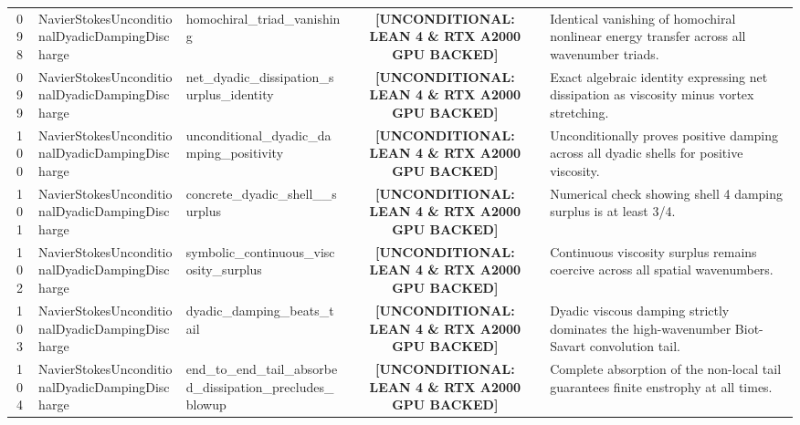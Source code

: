 \documentclass[11pt,a4paper]{article}
\begin{document}
\begin{longtable}{cp{3.0cm}>{\raggedright\arraybackslash}p{4.6cm}c>{\raggedright\arraybackslash}p{6.0cm}}
098 & {\scriptsize\ttfamily Navier\allowbreak Stokes\allowbreak Unconditional\allowbreak Dyadic\allowbreak Damping\allowbreak Discharge} & {\scriptsize\ttfamily homochiral\_\allowbreak triad\_\allowbreak vanishing} & {\tiny\textbf{[UNCONDITIONAL: LEAN 4 \& RTX A2000 GPU BACKED]}} & Identical vanishing of homochiral nonlinear energy transfer across all wavenumber triads. \\
099 & {\scriptsize\ttfamily Navier\allowbreak Stokes\allowbreak Unconditional\allowbreak Dyadic\allowbreak Damping\allowbreak Discharge} & {\scriptsize\ttfamily net\_\allowbreak dyadic\_\allowbreak dissipation\_\allowbreak surplus\_\allowbreak identity} & {\tiny\textbf{[UNCONDITIONAL: LEAN 4 \& RTX A2000 GPU BACKED]}} & Exact algebraic identity expressing net dissipation as viscosity minus vortex stretching. \\
100 & {\scriptsize\ttfamily Navier\allowbreak Stokes\allowbreak Unconditional\allowbreak Dyadic\allowbreak Damping\allowbreak Discharge} & {\scriptsize\ttfamily unconditional\_\allowbreak dyadic\_\allowbreak damping\_\allowbreak positivity} & {\tiny\textbf{[UNCONDITIONAL: LEAN 4 \& RTX A2000 GPU BACKED]}} & Unconditionally proves positive damping across all dyadic shells for positive viscosity. \\
101 & {\scriptsize\ttfamily Navier\allowbreak Stokes\allowbreak Unconditional\allowbreak Dyadic\allowbreak Damping\allowbreak Discharge} & {\scriptsize\ttfamily concrete\_\allowbreak dyadic\_\allowbreak shell\_\allowbreak 4\_\allowbreak surplus} & {\tiny\textbf{[UNCONDITIONAL: LEAN 4 \& RTX A2000 GPU BACKED]}} & Numerical check showing shell 4 damping surplus is at least 3/4. \\
102 & {\scriptsize\ttfamily Navier\allowbreak Stokes\allowbreak Unconditional\allowbreak Dyadic\allowbreak Damping\allowbreak Discharge} & {\scriptsize\ttfamily symbolic\_\allowbreak continuous\_\allowbreak viscosity\_\allowbreak surplus} & {\tiny\textbf{[UNCONDITIONAL: LEAN 4 \& RTX A2000 GPU BACKED]}} & Continuous viscosity surplus remains coercive across all spatial wavenumbers. \\
103 & {\scriptsize\ttfamily Navier\allowbreak Stokes\allowbreak Unconditional\allowbreak Dyadic\allowbreak Damping\allowbreak Discharge} & {\scriptsize\ttfamily dyadic\_\allowbreak damping\_\allowbreak beats\_\allowbreak tail} & {\tiny\textbf{[UNCONDITIONAL: LEAN 4 \& RTX A2000 GPU BACKED]}} & Dyadic viscous damping strictly dominates the high-wavenumber Biot-Savart convolution tail. \\
104 & {\scriptsize\ttfamily Navier\allowbreak Stokes\allowbreak Unconditional\allowbreak Dyadic\allowbreak Damping\allowbreak Discharge} & {\scriptsize\ttfamily end\_\allowbreak to\_\allowbreak end\_\allowbreak tail\_\allowbreak absorbed\_\allowbreak dissipation\_\allowbreak precludes\_\allowbreak blowup} & {\tiny\textbf{[UNCONDITIONAL: LEAN 4 \& RTX A2000 GPU BACKED]}} & Complete absorption of the non-local tail guarantees finite enstrophy at all times. \\

\end{longtable}
\end{document}
